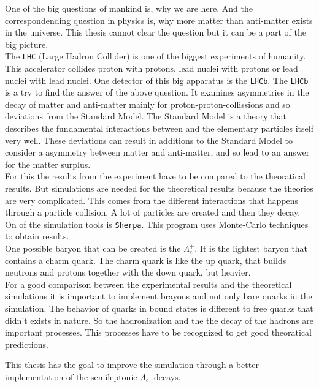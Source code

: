 One of the big questions of mankind is, why we are here. And the correspondending 
question in physics is, why more matter than anti-matter exists in the universe. 
This thesis cannot clear the question but it can be a part of the big picture.\\
The \texttt{LHC} (Large Hadron Collider) is one of the biggest experiments of 
humanity. This accelerator collides proton with protons, lead nuclei with 
protons or lead nuclei with lead nuclei. One detector of this big apparatus 
is the \texttt{LHCb}. The \texttt{LHCb} is a try to find the answer of the 
above question. It examines asymmetries in the decay of matter and 
anti-matter mainly for proton-proton-collissions and so deviations 
from the Standard Model. The Standard Model is a theory that describes the 
fundamental interactions between and the elementary particles itself very 
well. These deviations can result in additions to the Standard Model to consider 
a asymmetry between matter and anti-matter, and so lead to an answer for the 
matter surplus.\\
For this the results from the experiment have to be compared to the 
theoratical results. But simulations are needed for the theoretical results because 
the theories are very complicated.
This comes from the different interactions that happens through a particle 
collision. A lot of particles are created and then they decay. On of the simulation 
tools is \texttt{Sherpa}{\cite{sherpa}}. This program uses Monte-Carlo techniques 
to obtain results.\\
One possible baryon that can be created is the \(\Lambda_c^+\). It is the 
lightest baryon that contains a charm quark. The charm quark is like the 
up quark, that builds neutrons and protons together with the down quark, but 
heavier.\\
For a good comparison between the experimental results and the theoretical 
simulations it is important to implement brayons and not only bare quarks in the 
simulation. The behavior of quarks in bound states is different to free quarks 
that didn't exists in nature. So the hadronization and the the decay of the 
hadrons are important processes. This processes have to be recognized to 
get good theoratical predictions.
\par
This thesis has the goal to improve the simulation through a better implementation 
of the semileptonic \(\Lambda_c^+\) decays.

